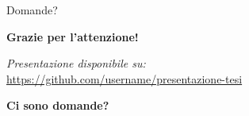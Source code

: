 \documentclass{beamer}
\begin{document}
	\begin{frame}{Domande?}
		\begin{center}
			\Large
			\textbf{Grazie per l'attenzione!}
			
			\vspace{1em}
			
			\normalsize
			\textit{Presentazione disponibile su:}\\
			\url{https://github.com/username/presentazione-tesi}
			
			\vspace{2em}
			
			\Large
			\textbf{Ci sono domande?}
		\end{center}
	\end{frame}
\end{document}
